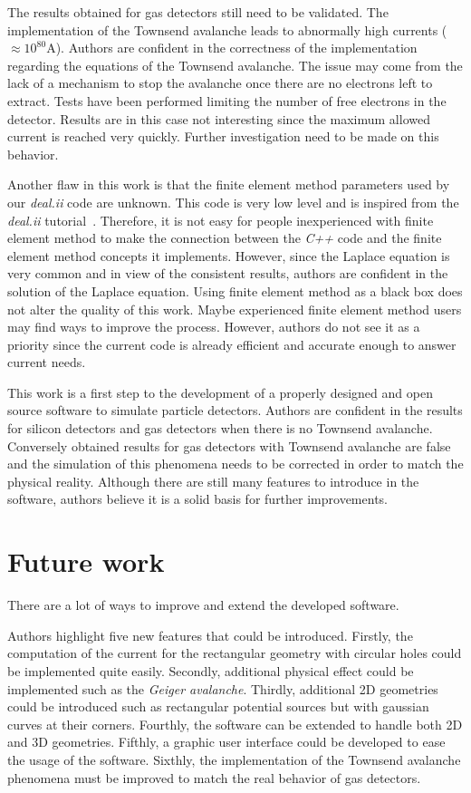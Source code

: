\documentclass[11pt]{article}
\begin{document}
	The results obtained for gas detectors still need to be validated. The
	implementation of the Townsend avalanche leads to abnormally high currents
	($\approx 10^{80}$A). Authors are confident in the correctness of the implementation
	regarding the equations of the Townsend avalanche. The issue may come from the
	lack of a mechanism to stop the avalanche once there are no electrons left
	to extract. Tests have been performed limiting the number of free electrons in
	the detector. Results are in this case not interesting since the maximum allowed
	current is reached very quickly. Further investigation need to be made on this
	behavior.

	Another flaw in this work is that the finite element method parameters used
	by our \textit{deal.ii} code are unknown. This code is very low level and
	is inspired from the \textit{deal.ii} tutorial~\cite{deal.iituto}.
	Therefore, it is not easy for people inexperienced with finite
	element method to make the connection between the \textit{C++} code and
	the finite element method concepts it implements. However, since
	the Laplace equation is very common and in view of the consistent results,
	authors are confident in the solution of the Laplace equation. Using finite
	element method as a black box does not alter the quality of this work. Maybe
	experienced finite element method users may find ways to improve the process.
	However, authors do not see it as a priority since the current code is already
	efficient and accurate enough to answer current needs.

	This work is a first step to the development of a properly designed and open source
	software to simulate particle detectors. Authors are confident in the results
	for silicon detectors and gas detectors when there is no Townsend avalanche.
	Conversely obtained results for gas detectors with Townsend avalanche are
	false and the simulation of this phenomena needs to be corrected in order
	to match the physical reality.
	Although there are still
	many features to introduce in the software, authors believe it is a solid
	basis for further improvements.



	\section*{Future work}

		There are a lot of ways to improve and extend the developed software.

		Authors highlight five new features that could be introduced. Firstly, the
		computation of the current for the
		rectangular geometry with circular holes could be implemented quite easily.
		Secondly, additional physical effect
		could be implemented such as the \textit{Geiger avalanche}. Thirdly,
		additional 2D geometries could be introduced such as
		rectangular potential sources but with gaussian curves at their corners.
		Fourthly, the software can be extended to handle both 2D and 3D geometries.
		Fifthly, a graphic user interface could be developed to ease the usage of the
		software. Sixthly, the implementation of the Townsend avalanche phenomena
		must be improved to match the real behavior of gas detectors.
\end{document}
